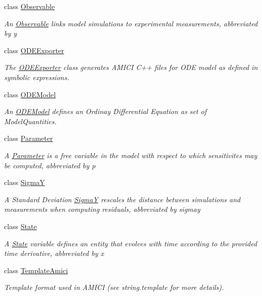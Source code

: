 \begin{DoxyCompactItemize}
class \mbox{\hyperlink{classamici_1_1ode__export_1_1_observable}{Observable}}
\begin{DoxyCompactList}\small\item\em An \mbox{\hyperlink{classamici_1_1ode__export_1_1_observable}{Observable}} links model simulations to experimental measurements, abbreviated by {\ttfamily y} \end{DoxyCompactList}\item 
class \mbox{\hyperlink{classamici_1_1ode__export_1_1_o_d_e_exporter}{O\+D\+E\+Exporter}}
\begin{DoxyCompactList}\small\item\em The \mbox{\hyperlink{classamici_1_1ode__export_1_1_o_d_e_exporter}{O\+D\+E\+Exporter}} class generates A\+M\+I\+CI C++ files for O\+DE model as defined in symbolic expressions. \end{DoxyCompactList}\item 
class \mbox{\hyperlink{classamici_1_1ode__export_1_1_o_d_e_model}{O\+D\+E\+Model}}
\begin{DoxyCompactList}\small\item\em An \mbox{\hyperlink{classamici_1_1ode__export_1_1_o_d_e_model}{O\+D\+E\+Model}} defines an Ordinay Differential Equation as set of Model\+Quantities. \end{DoxyCompactList}\item 
class \mbox{\hyperlink{classamici_1_1ode__export_1_1_parameter}{Parameter}}
\begin{DoxyCompactList}\small\item\em A \mbox{\hyperlink{classamici_1_1ode__export_1_1_parameter}{Parameter}} is a free variable in the model with respect to which sensitivites may be computed, abbreviated by {\ttfamily p} \end{DoxyCompactList}\item 
class \mbox{\hyperlink{classamici_1_1ode__export_1_1_sigma_y}{SigmaY}}
\begin{DoxyCompactList}\small\item\em A Standard Deviation \mbox{\hyperlink{classamici_1_1ode__export_1_1_sigma_y}{SigmaY}} rescales the distance between simulations and measurements when computing residuals, abbreviated by {\ttfamily sigmay} \end{DoxyCompactList}\item 
class \mbox{\hyperlink{classamici_1_1ode__export_1_1_state}{State}}
\begin{DoxyCompactList}\small\item\em A \mbox{\hyperlink{classamici_1_1ode__export_1_1_state}{State}} variable defines an entity that evolves with time according to the provided time derivative, abbreviated by {\ttfamily x} \end{DoxyCompactList}\item 
class \mbox{\hyperlink{classamici_1_1ode__export_1_1_template_amici}{Template\+Amici}}
\begin{DoxyCompactList}\small\item\em Template format used in A\+M\+I\+CI (see string.\+template for more details). \end{DoxyCompactList}\end{DoxyCompactItemize}
